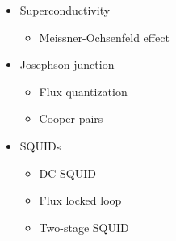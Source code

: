 \documentclass[16pt]{beamer}
\begin{document}
	\begin{frame}
		\begin{columns}
			\begin{column}{0.4\textwidth}
				\begin{itemize}
					\item<1-2> Superconductivity
					\begin{itemize}
						\item<2> Meissner-Ochsenfeld effect
					\end{itemize}
					
					\item<3-5> Josephson junction
					\begin{itemize}
						\item<4> Flux quantization
						\item<5> Cooper pairs
					\end{itemize}
					
					\item<6-9> SQUIDs
					\begin{itemize}
						\item<7> DC SQUID
						\item<8> Flux locked loop
						\item<9> Two-stage SQUID
					\end{itemize}
				\end{itemize}
			\end{column}
			

\end{columns}
\end{frame}
\end{document}
